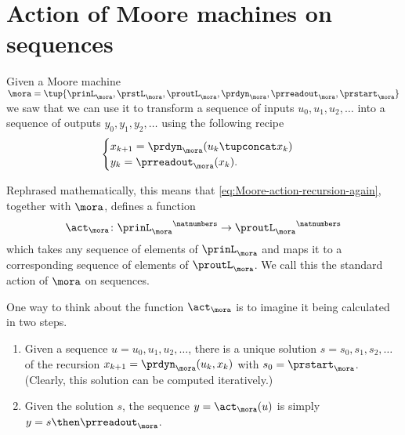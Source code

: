 
\section{Action of Moore machines on sequences}
\label{sec:Moore-acting-on-sequences}

Given a Moore machine $\mora = \tup{\prinL_\mora,\prstL_\mora,\proutL_\mora,\prdyn_\mora,\prreadout_\mora,\prstart_\mora}$
we saw that we can use it to transform a sequence of inputs $u_0, u_1, u_2, \dots$ into a sequence of outputs $y_0, y_1, y_2, \dots$ using the following recipe
\begin{equation}
    \label{eq:Moore-action-recursion-again}
    \begin{cases}
        x_{k+1} = \prdyn_\mora(u_k \tupconcat x_k) \\
        y_{k}   = \prreadout_\mora(x_{k}).
    \end{cases}
\end{equation}

Rephrased mathematically, this means that \cref{eq:Moore-action-recursion-again}, together with $\mora$, defines a function
\begin{equation*}
\act_{\mora} \colon {\prinL_\mora}^\natnumbers \to {\proutL_\mora}^\natnumbers
\end{equation*}
which takes any sequence  of elements of $\prinL_\mora$ and maps it to a corresponding sequence  of elements of $\proutL_\mora$.  We call this the standard action of $\mora$ on sequences.


\begin{remark}
    \label{re:moore-action-two-steps}
    One way to think about the function $\act_{\mora}$ is to imagine it being calculated in two steps.
    \begin{enumerate}
        \item Given a sequence $u = u_0, u_1, u_2, \dots$, there is a unique solution $s = s_0, s_1, s_2, \dots$ of the recursion $x_{k+1} = \prdyn_\mora(u_k, x_k)$ with $s_0 = \prstart_\mora$. (Clearly, this solution can be computed iteratively.)
        \item Given the solution $s$, the sequence $y = \act_{\mora}(u)$ is simply $y = s \then \prreadout_\mora$.
    \end{enumerate}
\end{remark}

